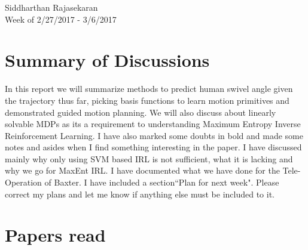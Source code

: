 \documentclass{article}[11pt]
\begin{document}
\begin{center}
Siddharthan Rajasekaran\\
Week of 2/27/2017 - 3/6/2017
\end{center}

\section{Summary of Discussions}
In this report we will summarize methods to predict human swivel angle given the trajectory thus far, picking basis functions to learn motion primitives and demonstrated guided motion planning. We will also discuss about linearly solvable MDPs as its a requirement to understanding Maximum Entropy Inverse Reinforcement Learning. I have also marked some doubts in bold and made some notes and asides when I find something interesting in the paper. I have discussed mainly why only using SVM based IRL is not sufficient, what it is lacking and why we go for MaxEnt IRL. I have documented what we have done for the Tele-Operation of Baxter. I have included a section``Plan for next week". Please correct my plans and let me know if anything else must be included to it. 

\section{Papers read}
\end{document}
